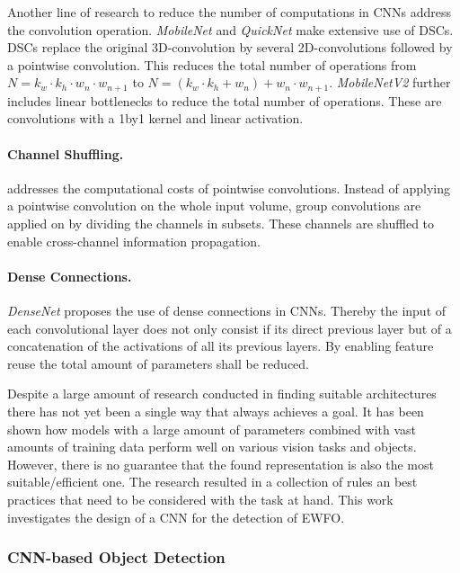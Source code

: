 Another line of research to reduce the number of computations in \acp{CNN} address the convolution operation. \textit{MobileNet} \cite{Howard2017} and \textit{QuickNet} \cite{Ghosh2017} make extensive use of \acp{DSC}. \acp{DSC} replace the original 3D-convolution by several 2D-convolutions followed by a pointwise convolution. This reduces the total number of operations from $N = k_w \cdot k_h \cdot w_n \cdot w_{n+1}$ to $N=(k_w \cdot k_h + w_n)+w_n \cdot w_{n+1}$. \textit{MobileNetV2} \cite{Sandler2018} further includes linear bottlenecks to reduce the total number of operations. These are convolutions with a 1by1 kernel and linear activation.

\paragraph{Channel Shuffling.}

\cite{Zhang2017a} addresses the computational costs of pointwise convolutions. Instead of applying a pointwise convolution on the whole input volume, group convolutions are applied on by dividing the channels in subsets. These channels are shuffled to enable cross-channel information propagation.

\paragraph{Dense Connections.}
\textit{DenseNet} \cite{Huang2016} proposes the use of dense connections in \acp{CNN}. Thereby the input of each convolutional layer does not only consist if its direct previous layer but of a concatenation of the activations of all its previous layers. By enabling feature reuse the total amount of parameters shall be reduced.

Despite a large amount of research conducted in finding suitable architectures there has not yet been a single way that always achieves a goal. It has been shown how models with a large amount of parameters combined with vast amounts of training data perform well on various vision tasks and objects. However, there is no guarantee that the found representation is also the most suitable/efficient one. The research resulted in a collection of rules an best practices that need to be considered with the task at hand. This work investigates the design of a \ac{CNN} for the detection of \ac{EWFO}.

\subsubsection{\ac{CNN}-based Object Detection}

